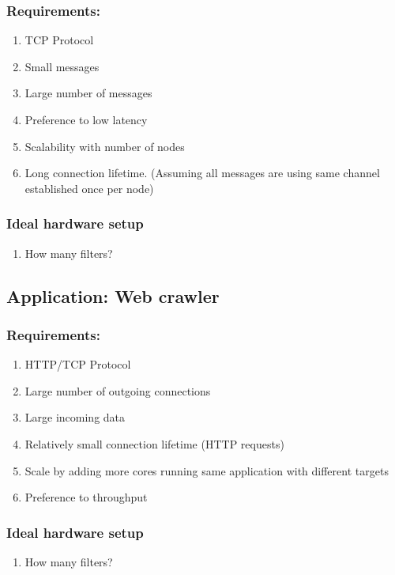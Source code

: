 \subsubsection{Requirements:}
\begin{enumerate}
    \item TCP Protocol
    \item Small messages
    \item Large number of messages
    \item Preference to low latency
    \item Scalability with number of nodes
    \item Long connection lifetime. (Assuming all messages are using same
            channel established once per node)
\end{enumerate}

\subsubsection{Ideal hardware setup}
\begin{enumerate}
    \item How many filters?
\end{enumerate}


\subsection{Application: Web crawler}

\subsubsection{Requirements:}
\begin{enumerate}
    \item HTTP/TCP Protocol
    \item Large number of outgoing connections
    \item Large incoming data
    \item Relatively small connection lifetime (HTTP requests)
    \item Scale by adding more cores running same application with different
        targets
    \item Preference to throughput
\end{enumerate}

\subsubsection{Ideal hardware setup}
\begin{enumerate}
    \item How many filters?
\end{enumerate}

